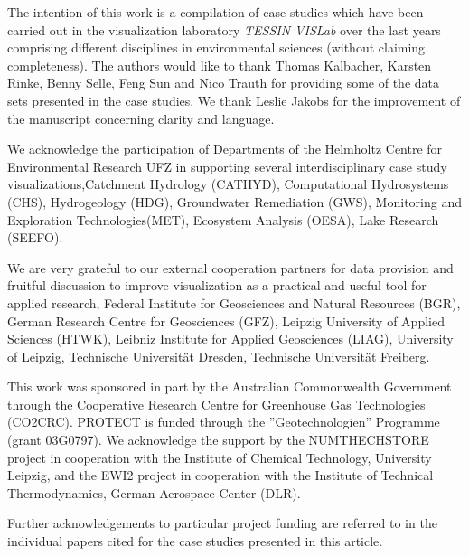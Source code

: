 \documentclass[twocolumn]{svjour3}          %
\begin{document}
\begin{acknowledgements}
The intention of this work is a compilation of case studies which have been carried out in the visualization laboratory \emph{TESSIN VISLab} over the last years comprising different disciplines in environmental sciences (without claiming completeness). The authors would like to thank Thomas Kalbacher, Karsten Rinke, Benny Selle, Feng Sun and Nico Trauth for providing some of the data sets presented in the case studies. We thank Leslie Jakobs for the improvement of the manuscript concerning clarity and language.

We acknowledge the participation of Departments of the Helmholtz Centre for Environmental Research UFZ in supporting several interdisciplinary case study visualizations,\linebreak Catchment Hydrology (CATHYD), Computational Hydrosystems (CHS), Hydrogeology (HDG), Groundwater Remediation (GWS), Monitoring and Exploration Technologies\linebreak (MET), Ecosystem Analysis (OESA), Lake Research (SEEFO).

We are very grateful to our external cooperation partners for data provision and fruitful discussion to improve visualization as a practical and useful tool for applied research, Federal Institute for Geosciences and Natural Resources (BGR), German Research Centre for Geosciences (GFZ), Leipzig University of Applied Sciences (HTWK), Leibniz Institute for Applied Geosciences (LIAG), University of Leipzig, Technische Universit\"at Dresden, Technische Universit\"at Freiberg.

This work was sponsored in part by the Australian Commonwealth Government through the Cooperative Research Centre for Greenhouse Gas Technologies (CO2CRC). PROTECT is fun\-ded through the ''Geotechnologien'' Programme (grant 03G0797). We acknowledge the support by the NUM\-THECHSTORE project in cooperation with the Institute of Chemical Technology, University Leipzig, and the EWI2 project in cooperation with the Institute of Technical Thermodynamics, German Aerospace Center (DLR).


Further acknowledgements to particular project funding are referred to in the individual papers cited for the case studies presented in this article.
\end{acknowledgements}

\end{document}
